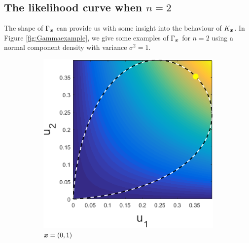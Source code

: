 	\subsection{The likelihood curve when \texorpdfstring{$n = 2$}{n = 2}}
		The shape of $\Gamma_{\bm{{x}}}$ can provide us with some insight into the behaviour of $K_{\bm{{x}}}$. In Figure \ref{fig:Gammaexample}, we give some examples of $\Gamma_{\bm{{x}}}$ for $n=2$ using a normal component density with variance $\sigma^2 = 1$. 
		\begin{figure}[ht]
			\begin{subfigure}[t]{0.32\textwidth}
				\centering
				\includegraphics[width = \textwidth]{Sigma1x1_0-x2_1}
				\caption{${\bm{{x}}} = (0,1)$} \label{subfig:gammaexamplea}
			\end{subfigure}
			\begin{subfigure}[t]{0.32\textwidth}
				\centering

\end{subfigure}
\end{figure}
